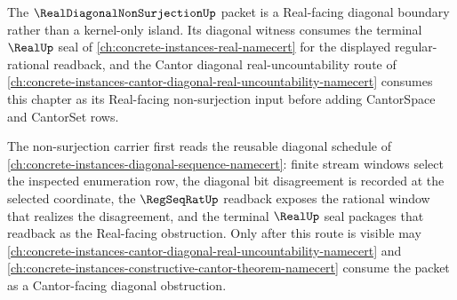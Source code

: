 The $\RealDiagonalNonSurjectionUp$ packet is a Real-facing diagonal boundary rather than a kernel-only island. Its diagonal witness consumes the terminal $\RealUp$ seal of \autoref{ch:concrete-instances-real-namecert} for the displayed regular-rational readback, and the Cantor diagonal real-uncountability route of \autoref{ch:concrete-instances-cantor-diagonal-real-uncountability-namecert} consumes this chapter as its Real-facing non-surjection input before adding CantorSpace and CantorSet rows.

The non-surjection carrier first reads the reusable diagonal schedule of \autoref{ch:concrete-instances-diagonal-sequence-namecert}: finite stream windows select the inspected enumeration row, the diagonal bit disagreement is recorded at the selected coordinate, the $\RegSeqRatUp$ readback exposes the rational window that realizes the disagreement, and the terminal $\RealUp$ seal packages that readback as the Real-facing obstruction. Only after this route is visible may \autoref{ch:concrete-instances-cantor-diagonal-real-uncountability-namecert} and \autoref{ch:concrete-instances-constructive-cantor-theorem-namecert} consume the packet as a Cantor-facing diagonal obstruction.
